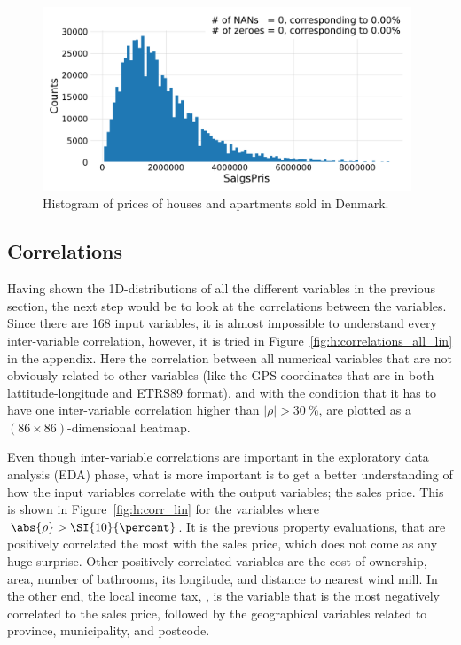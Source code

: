 \begin{figure}
  \includegraphics[width=0.98\textwidth, page=1, trim=15 15 15 15, clip]{figures/housing/overview_fig.pdf}
  \caption[Histogram of prices of houses and apartments sold in Denmark]
          {Histogram of prices of houses and apartments sold in Denmark.}
  \label{fig:h:price_overview_price}
\end{figure}

\subsection{Correlations}

Having shown the \num{1}D-distributions of all the different variables in the previous section, the next step would be to look at the correlations between the variables. Since there are \num{168} input variables, it is almost impossible to understand every inter-variable correlation, however, it is tried in Figure~\ref{fig:h:correlations_all_lin} in the appendix. Here the correlation between all numerical variables that are not obviously related to other variables (like the GPS-coordinates that are in both lattitude-longitude and ETRS89 format), and with the condition that it has to have one inter-variable correlation higher than $|\rho| > \SI{30}{\percent}$, are plotted as a $(86 \times 86)$-dimensional heatmap.

Even though inter-variable correlations are important in the exploratory data analysis (EDA) phase, what is more important is to get a better understanding of how the input variables correlate with the output variables; the sales price. This is shown in Figure~\ref{fig:h:corr_lin} for the variables where $\abs{\rho} > \SI{10}{\percent}$. It is the previous property evaluations,  that are positively correlated the most with the sales price, which does not come as any huge surprise. Other positively correlated variables are the cost of ownership, area, number of bathrooms, its longitude, and distance to nearest wind mill. In the other end, the local income tax, , is the variable that is the most negatively correlated to the sales price, followed by the geographical variables related to province, municipality, and postcode.

